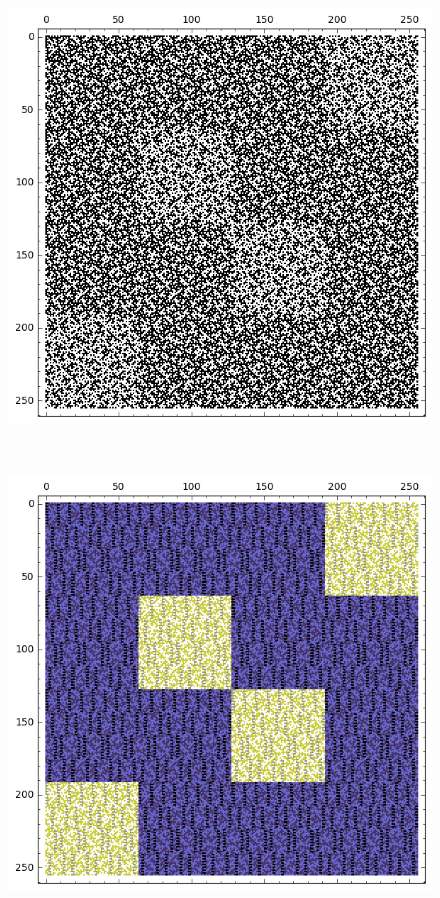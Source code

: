 \documentclass[12pt,a4paper]{article}
\begin{document}
\begin{figure}[!bhpt] %
\centering
\begin{minipage}{.48\textwidth}
  \centering
  \includegraphics[width=.9\linewidth]{../matrix_plot/re8_7_weight_class_matrix.png}
  \label{fig:8_7_weight_class_matrix}
\end{minipage}%
~~~~
\begin{minipage}{.48\textwidth}
  \centering
  \includegraphics[width=.9\linewidth]{../matrix_plot/re8_7_bent_cayley_graph_index_matrix.png}
  \label{fig:8_7_bent_cayley_graph_index_matrix}
\end{minipage}
\end{figure}
~
\end{document}
